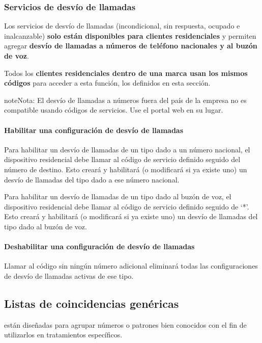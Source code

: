 \documentclass[letterpaper,10pt,spanish]{sphinxmanual}
\begin{document}
\subsubsection{Servicios de desvío de llamadas}
\label{administration_portal/brand/settings/generic_services:call-forward-services}\label{administration_portal/brand/settings/generic_services:id1}
Los servicios de desvío de llamadas (incondicional, sin respuesta, ocupado e inalcanzable) \textbf{solo están disponibles para clientes residenciales} y permiten agregar \textbf{desvío de llamadas a números de teléfono nacionales y al buzón de voz}.

Todos los \textbf{clientes residenciales dentro de una marca usan los mismos códigos} para acceder a esta función, los definidos en esta sección.

\begin{notice}{note}{Nota:}
El desvío de llamadas a números fuera del país de la empresa no es compatible usando códigos de servicios. Use el portal web en su lugar.
\end{notice}
\paragraph{Habilitar una configuración de desvío de llamadas}

Para habilitar un desvío de llamadas de un tipo dado a un número nacional, el dispositivo residencial debe llamar al código de servicio definido seguido del número de destino. Esto creará y habilitará (o modificará si ya existe uno) un desvío de llamadas del tipo dado a ese número nacional.

Para habilitar un desvío de llamadas de un tipo dado al buzón de voz, el dispositivo residencial debe llamar al código de servicio definido seguido de `*'. Esto creará y habilitará (o modificará si ya existe uno) un desvío de llamadas del tipo dado al buzón de voz.
\paragraph{Deshabilitar una configuración de desvío de llamadas}

Llamar al código sin ningún número adicional eliminará todas las configuraciones de desvío de llamadas activas de ese tipo.


\subsection{Listas de coincidencias genéricas}
\label{administration_portal/brand/settings/generic_match_lists:generic-match-lists}\label{administration_portal/brand/settings/generic_match_lists::doc}\label{administration_portal/brand/settings/generic_match_lists:brand-match-lists}
{\hyperref[administration_portal/client/vpbx/routing_tools/match_lists:id1]{}} están diseñadas para agrupar números o patrones bien conocidos con el fin de utilizarlos en tratamientos específicos.
\end{document}
